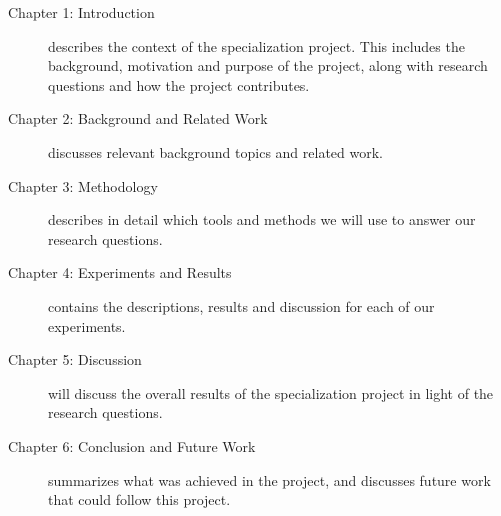 \begin{description}
    \item[Chapter 1: Introduction] describes the context of the specialization project. This includes the background, motivation and purpose of the project, along with research questions and how the project contributes.
    \item[Chapter 2: Background and Related Work] discusses relevant background topics and related work.
    \item[Chapter 3: Methodology] describes in detail which tools and methods we will use to answer our research questions.
    \item[Chapter 4: Experiments and Results] contains the descriptions, results and discussion for each of our experiments.
    \item[Chapter 5: Discussion] will discuss the overall results of the specialization project in light of the research questions.
    \item[Chapter 6: Conclusion and Future Work] summarizes what was achieved in the project, and discusses future work that could follow this project.
\end{description}
